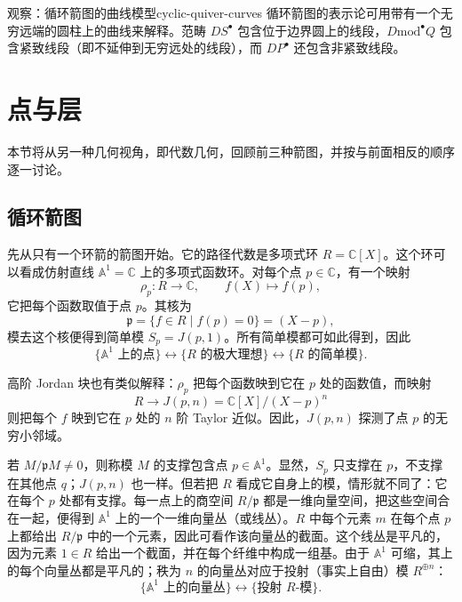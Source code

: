 \begin{proposition}{观察：循环箭图的曲线模型}{cyclic-quiver-curves}
循环箭图的表示论可用带有一个无穷远端的圆柱上的曲线来解释。范畴 $DS^\bullet$ 包含位于边界圆上的线段，$D\mathrm{mod}^\bullet Q$ 包含紧致线段（即不延伸到无穷远处的线段），而 $DP^\bullet$ 还包含非紧致线段。
\end{proposition}

\section{点与层}\label{sec:points-sheaves}
本节将从另一种几何视角，即代数几何，回顾前三种箭图，并按与前面相反的顺序逐一讨论。

\subsection{循环箭图}\label{subsec:cyclic-quiver-sheaves}
先从只有一个环箭的箭图开始。它的路径代数是多项式环 $R=\mathbb C[X]$。这个环可以看成仿射直线 $\mathbb A^1=\mathbb C$ 上的多项式函数环。对每个点 $p\in\mathbb C$，有一个映射
\[
  \rho_p\colon R\to\mathbb C,\qquad f(X)\longmapsto f(p),
\]
它把每个函数取值于点 $p$。其核为
\[
  \mathfrak p=\{f\in R\mid f(p)=0\}=(X-p),
\]
模去这个核便得到简单模 $S_p=J(p,1)$。所有简单模都可如此得到，因此
\[
  \{\mathbb A^1\text{ 上的点}\}
  \longleftrightarrow\{R\text{ 的极大理想}\}
  \longleftrightarrow\{R\text{ 的简单模}\}.
\]

高阶 Jordan 块也有类似解释：$\rho_p$ 把每个函数映到它在 $p$ 处的函数值，而映射
\[
  R\to J(p,n)=\mathbb C[X]/(X-p)^n
\]
则把每个 $f$ 映到它在 $p$ 处的 $n$ 阶 Taylor 近似。因此，$J(p,n)$ 探测了点 $p$ 的无穷小邻域。

若 $M/\mathfrak pM\ne0$，则称模 $M$ 的支撑包含点 $p\in\mathbb A^1$。显然，$S_p$ 只支撑在 $p$，不支撑在其他点 $q$；$J(p,n)$ 也一样。但若把 $R$ 看成它自身上的模，情形就不同了：它在每个 $p$ 处都有支撑。每一点上的商空间 $R/\mathfrak p$ 都是一维向量空间，把这些空间合在一起，便得到 $\mathbb A^1$ 上的一个一维向量丛（或线丛）。$R$ 中每个元素 $m$ 在每个点 $p$ 上都给出 $R/\mathfrak p$ 中的一个元素，因此可看作该向量丛的截面。这个线丛是平凡的，因为元素 $1\in R$ 给出一个截面，并在每个纤维中构成一组基。由于 $\mathbb A^1$ 可缩，其上的每个向量丛都是平凡的；秩为 $n$ 的向量丛对应于投射（事实上自由）模 $R^{\oplus n}$：
\[
  \{\mathbb A^1\text{ 上的向量丛}\}
  \longleftrightarrow\{\text{投射 }R\text{-模}\}.
\]

